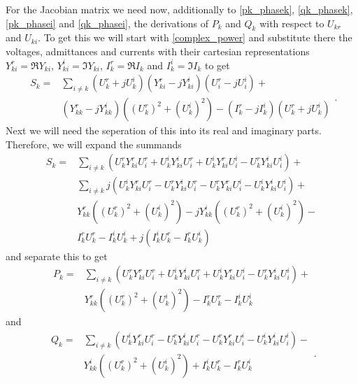 For the Jacobian matrix we need now, additionally to \eqref{pk_phasek}, \eqref{qk_phasek}, \eqref{pk_phasei} and \eqref{qk_phasei}, the derivations of $P_k$ and $Q_k$ with respect to $U_{kr}$ and $U_{ki}$. To get this we will start with \eqref{complex_power} and substitute there the voltages, admittances and currents with their cartesian representations $Y_{ki}^r = \Re{Y_{ki}}$, $Y_{ki}^i = \Im{Y_{ki}}$, $I_k^r = \Re{I_k}$ and $I_k^i = \Im{I_k}$ to get
\begin{equation}
	\begin{split}
		S_k = & \sum_{i \ne k} (U_k^r + j U_k^i) (Y_{ki}^r - j Y_{ki}^i) (U_i^r - j U_i^i) + \\
			  & (Y_{kk}^r - j Y_{kk}^i) ( (U_k^r)^2 + (U_k^i)^2 ) - (I_k^r - j I_k^i) (U_k^r + j U_k^i)			
	\end{split}.
\end{equation}
Next we will need the seperation of this into its real and imaginary parts. Therefore, we will expand the summands
\begin{equation}
	\begin{split}
		S_k = & \sum_{i \ne k} \left( U_k^r Y_{ki}^r U_i^r + U_k^i Y_{ki}^i U_i^r + U_k^i Y_{ki}^r U_i^i - U_k^r Y_{ki}^i U_i^i \right) + \\
			  & \sum_{i \ne k} j \left( U_k^i Y_{ki}^r U_i^r - U_k^r Y_{ki}^i U_i^r - U_k^r Y_{ki}^r U_i^i - U_k^i Y_{ki}^i U_i^i \right) + \\
			  & Y_{kk}^r ( (U_k^r)^2 + (U_k^i)^2 ) - j Y_{kk}^i ( (U_k^r)^2 + (U_k^i)^2 ) - \\
			  & I_k^r U_k^r - I_k^i U_k^i + j (I_k^i U_k^r - I_k^r U_k^i)
	\end{split}
\end{equation}
and separate this to get
\begin{equation}
	\begin{split}
		P_k = & \sum_{i \ne k} \left( U_k^r Y_{ki}^r U_i^r + U_k^i Y_{ki}^i U_i^r + U_k^i Y_{ki}^r U_i^i - U_k^r Y_{ki}^i U_i^i \right) + \\
			  & Y_{kk}^r ( (U_k^r)^2 + (U_k^i)^2 ) - I_k^r U_k^r - I_k^i U_k^i
	\end{split}
\end{equation}
and
\begin{equation}
	\begin{split}
		Q_k = & \sum_{i \ne k} \left( U_k^i Y_{ki}^r U_i^r - U_k^r Y_{ki}^i U_i^r - U_k^r Y_{ki}^r U_i^i - U_k^i Y_{ki}^i U_i^i \right) - \\
			  & Y_{kk}^i ( (U_k^r)^2 + (U_k^i)^2 ) + I_k^i U_k^r - I_k^r U_k^i
	\end{split}.
\end{equation}

